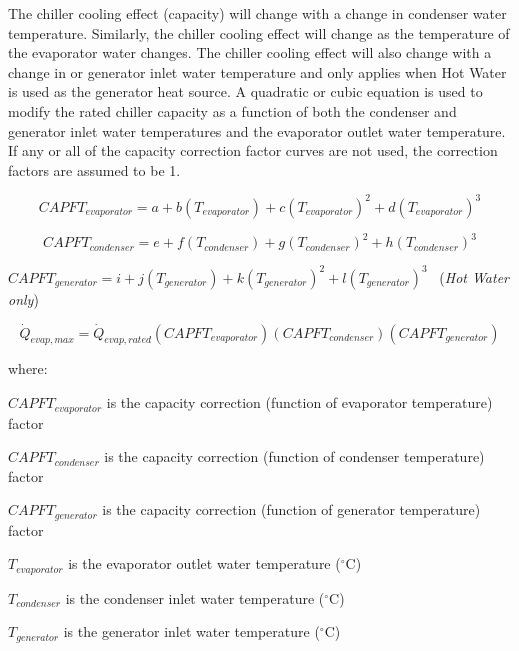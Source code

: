 The chiller cooling effect (capacity) will change with a change in condenser water temperature. Similarly, the chiller cooling effect will change as the temperature of the evaporator water changes. The chiller cooling effect will also change with a change in or generator inlet water temperature and only applies when Hot Water is used as the generator heat source. A quadratic or cubic equation is used to modify the rated chiller capacity as a function of both the condenser and generator inlet water temperatures and the evaporator outlet water temperature. If any or all of the capacity correction factor curves are not used, the correction factors are assumed to be 1.

\begin{equation}
CAPF{T_{evaporator}} = a + b\left( {{T_{evaporator}}} \right) + c{\left( {{T_{evaporator}}} \right)^2} + d{\left( {{T_{evaporator}}} \right)^3}
\end{equation}

\begin{equation}
CAPF{T_{condenser}} = e + f\left( {{T_{condenser}}} \right) + g{\left( {{T_{condenser}}} \right)^2} + h{\left( {{T_{condenser}}} \right)^3}
\end{equation}

\(CAPF{T_{generator}} = i + j\left( {{T_{generator}}} \right) + k{\left( {{T_{generator}}} \right)^2} + l{\left( {{T_{generator}}} \right)^3}\) ~(\emph{Hot Water only})

\begin{equation}
{\dot{Q}_{evap,max}} = {\dot{Q}_{evap,rated}}\left( {CAPF{T_{evaporator}}} \right)\left( {CAPF{T_{condenser}}} \right)\left( {CAPF{T_{generator}}} \right)
\end{equation}

where:

\(CAPF{T_{evaporator}}\) is the capacity correction (function of evaporator temperature) factor

\(CAPF{T_{condenser}}\) is the capacity correction (function of condenser temperature) factor

\(CAPF{T_{generator}}\) is the capacity correction (function of generator temperature) factor

\({T_{evaporator}}\) is the evaporator outlet water temperature (\(^{\circ}\)C)

\({T_{condenser}}\) is the condenser inlet water temperature (\(^{\circ}\)C)

\({T_{generator}}\) is the generator inlet water temperature (\(^{\circ}\)C)

